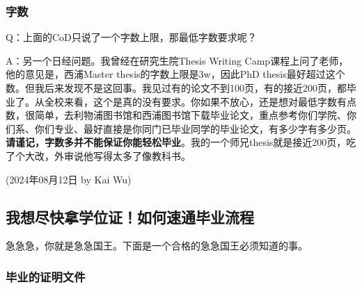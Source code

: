 \subsubsection{字数}

Q：上面的CoD只说了一个字数上限，那最低字数要求呢？

A：另一个日经问题。我曾经在研究生院Thesis Writing Camp课程上问了老师，他的意见是，西浦Master thesis的字数上限是3w，因此PhD thesis最好超过这个数。但我后来发现不是这回事。我见过有的论文不到100页，有的接近200页，都毕业了。从全校来看，这个是真的没有要求。你如果不放心，还是想对最低字数有点数，很简单，去利物浦图书馆和西浦图书馆下载毕业论文，重点参考你们学院、你们系、你们专业、最好直接是你同门已毕业同学的毕业论文，有多少字有多少页。\textbf{请谨记，字数多并不能保证你能轻松毕业}。我的一个师兄thesis就是接近200页，吃了个大改，外审说他写得太多了像教科书。

\begin{flushright}
    (2024年08月12日 by Kai Wu)
\end{flushright}



\subsection{我想尽快拿学位证！如何速通毕业流程}

急急急，你就是急急国王。下面是一个合格的急急国王必须知道的事。

\subsubsection{毕业的证明文件}

